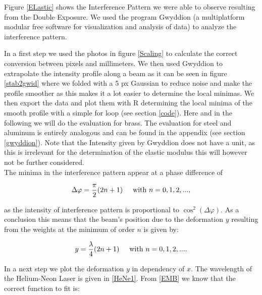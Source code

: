 Figure \ref{ELastic} shows the Interference Pattern we were able to observe resulting from the Double Exposure. We used the program Gwyddion (a multiplatform modular free software for visualization and analysis of data) to analyze the interference pattern.  


In a first step we used the photos in figure \ref{Scaling} to calculate the correct conversion between pixels and millimeters. We then used Gwyddion to extrapolate the intensity profile along a beam as it can be seen in figure \ref{stab2gwid} where we folded with a 5 px Gaussian to reduce noise and make the profile smoother as this makes it a lot easier to determine the local minimas. We then export the data and plot them with R determining the local minima of the smooth profile with a simple for loop (see section \ref{code}).  Here and in the following we will do the evaluation for brass. The evaluation for steel and aluminum is entirely analogous and can be found in the appendix (see section \ref{gwyddion}). Note that the Intensity given by Gwyddion does not have a unit, as this is irrelevant for the determination of the elastic modulus this will however not be further considered.\\

The minima in the interference pattern appear at a phase difference of

\begin{align*}
\Delta \varphi=\frac{\pi}{2}(2n+1)\hspace{0.5cm}\mbox{with }n=0,1,2,...,
\end{align*}

as the intensity of interference pattern is proportional to $\cos^2(\Delta\varphi)$. As a conclusion this means that the beam's position due to the deformation $y$ resulting from the weights at the minimum of order $n$ is given by:

\begin{align*}
y=\frac{\lambda}{4}(2n+1)\hspace{0.5cm}\mbox{with }n=0,1,2,... .
\end{align*}

In a next step we plot the deformation $y$ in dependency of $x$. The wavelength of the Helium-Neon Laser is given in \ref{HeNe1}. From \ref{EMB} we know that the correct function to fit is:

